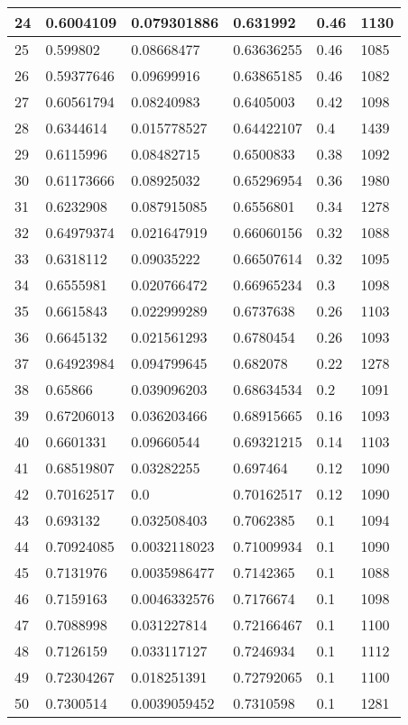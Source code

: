 \begin{longtable}{|l|l|l|l|l|l|}
24 & 0.6004109 & 0.079301886 & 0.631992 & 0.46 & 1130 \\ \hline 
25 & 0.599802 & 0.08668477 & 0.63636255 & 0.46 & 1085 \\ \hline 
26 & 0.59377646 & 0.09699916 & 0.63865185 & 0.46 & 1082 \\ \hline 
27 & 0.60561794 & 0.08240983 & 0.6405003 & 0.42 & 1098 \\ \hline 
28 & 0.6344614 & 0.015778527 & 0.64422107 & 0.4 & 1439 \\ \hline 
29 & 0.6115996 & 0.08482715 & 0.6500833 & 0.38 & 1092 \\ \hline 
30 & 0.61173666 & 0.08925032 & 0.65296954 & 0.36 & 1980 \\ \hline 
31 & 0.6232908 & 0.087915085 & 0.6556801 & 0.34 & 1278 \\ \hline 
32 & 0.64979374 & 0.021647919 & 0.66060156 & 0.32 & 1088 \\ \hline 
33 & 0.6318112 & 0.09035222 & 0.66507614 & 0.32 & 1095 \\ \hline 
34 & 0.6555981 & 0.020766472 & 0.66965234 & 0.3 & 1098 \\ \hline 
35 & 0.6615843 & 0.022999289 & 0.6737638 & 0.26 & 1103 \\ \hline 
36 & 0.6645132 & 0.021561293 & 0.6780454 & 0.26 & 1093 \\ \hline 
37 & 0.64923984 & 0.094799645 & 0.682078 & 0.22 & 1278 \\ \hline 
38 & 0.65866 & 0.039096203 & 0.68634534 & 0.2 & 1091 \\ \hline 
39 & 0.67206013 & 0.036203466 & 0.68915665 & 0.16 & 1093 \\ \hline 
40 & 0.6601331 & 0.09660544 & 0.69321215 & 0.14 & 1103 \\ \hline 
41 & 0.68519807 & 0.03282255 & 0.697464 & 0.12 & 1090 \\ \hline 
42 & 0.70162517 & 0.0 & 0.70162517 & 0.12 & 1090 \\ \hline 
43 & 0.693132 & 0.032508403 & 0.7062385 & 0.1 & 1094 \\ \hline 
44 & 0.70924085 & 0.0032118023 & 0.71009934 & 0.1 & 1090 \\ \hline 
45 & 0.7131976 & 0.0035986477 & 0.7142365 & 0.1 & 1088 \\ \hline 
46 & 0.7159163 & 0.0046332576 & 0.7176674 & 0.1 & 1098 \\ \hline 
47 & 0.7088998 & 0.031227814 & 0.72166467 & 0.1 & 1100 \\ \hline 
48 & 0.7126159 & 0.033117127 & 0.7246934 & 0.1 & 1112 \\ \hline 
49 & 0.72304267 & 0.018251391 & 0.72792065 & 0.1 & 1100 \\ \hline 
50 & 0.7300514 & 0.0039059452 & 0.7310598 & 0.1 & 1281 \\ \hline 
\end{longtable}